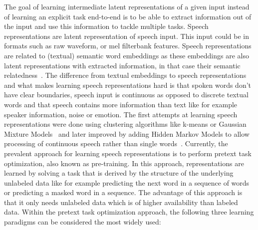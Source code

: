 The goal of learning intermediate latent representations of a given input instead of learning an explicit task end-to-end is to be able to extract information out of the input and use this information to tackle multiple tasks. Speech representations are latent representation of speech input. This input could be in formats such as raw waveform, or mel filterbank features. Speech representations are related to (textual) semantic word embeddings as these embeddings are also latent representations with extracted information, in that case their semantic relatedness~\cite{glove}. The difference from textual embeddings to speech representations and what makes learning speech representations hard is that spoken words don't have clear boundaries, speech input is continuous as opposed to discrete textual words and that speech contains more information than text like for example speaker information, noise or emotion.
The first attempts at learning speech representations were done using clustering algorithms like k-means or Gaussian Mixture Models~\cite{clustering} and later improved by adding Hidden Markov Models to allow processing of continuous speech rather than single words~\cite{HMMs}. Currently, the prevalent approach for learning speech representations is to perform pretext task optimization, also known as pre-training. In this approach, representations are learned by solving a task that is derived by the structure of the underlying unlabeled data like for example predicting the next word in a sequence of words or predicting a masked word in a sequence. The advantage of this approach is that it only needs unlabeled data which is of higher availability than labeled data. Within the pretext task optimization approach, the following three learning paradigms can be considered the most widely used:
